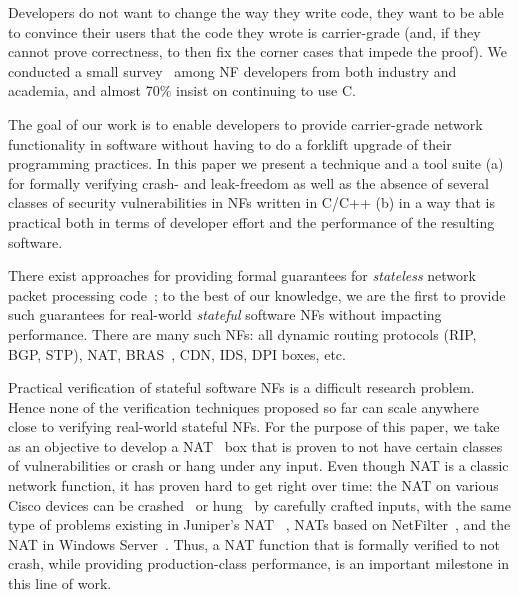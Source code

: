 \documentclass[letterpaper,twocolumn,10pt]{article}
\begin{document}
Developers do not want to change the way they write code, they want to be able to convince their users that the code they wrote is carrier-grade (and, if they cannot prove correctness, to then fix the corner cases that impede the proof). We conducted a small survey~\cite{verifsurvey} among NF developers from both industry and academia, and almost 70\% insist on continuing to use C. %

The goal of our work is to enable developers to provide  carrier-grade network functionality in software without having to do a forklift upgrade of their programming practices. In this paper we present a technique and a tool suite (a) for formally verifying crash- and leak-freedom as well as the absence of several classes of security vulnerabilities in NFs written in C/C++ (b) in a way that is practical both in terms of developer effort and the performance of the resulting software.

There exist approaches for providing formal guarantees for {\em stateless} network packet processing code~\cite{dobrescu2014software}; to the best of our knowledge, we are the first to provide such guarantees for real-world {\em stateful} software NFs without impacting performance. There are many such NFs: all dynamic routing protocols (RIP, BGP, STP), NAT, BRAS~\cite{wiki:bras}, CDN, IDS, DPI boxes, etc.

Practical verification of stateful software NFs is a difficult research problem. Hence none of the verification techniques proposed so far can scale anywhere close to verifying real-world stateful NFs. For the purpose of this paper, we take as an objective to develop a NAT~\cite{rfc3022} box that is proven to not have certain classes of vulnerabilities or crash or hang under any input. Even though NAT is a classic network function, it has proven hard to get right over time: the NAT on various Cisco devices can be crashed~\cite{cve-2015-6271} or hung~\cite{cve-2013-1138} by carefully crafted inputs, with the same type of problems existing in Juniper's NAT~ \cite{cve-2014-3817}, NATs based on NetFilter~\cite{cve-2014-9715}, and the NAT in Windows Server~\cite{ms13-064}. Thus, a NAT function that is formally verified to not crash, while providing production-class performance, is an important milestone in this line of work.
\end{document}
